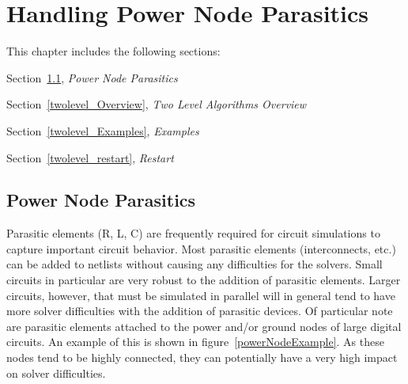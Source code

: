 



\chapter{Handling Power Node Parasitics}
\label{PowerNode_Chap}

{
This chapter includes the following sections:
\begin{XyceItemize}
\item Section~\ref{powerNode_Overview}, {\em Power Node Parasitics}
\item Section~\ref{twolevel_Overview}, {\em Two Level Algorithms Overview}
\item Section~\ref{twolevel_Examples}, {\em Examples}
\item Section~\ref{twolevel_restart}, {\em Restart}
\end{XyceItemize}
}

\section{Power Node Parasitics}
\label{powerNode_Overview}

Parasitic elements (R, L, C) are frequently required for circuit simulations
to capture important circuit behavior.  Most parasitic elements 
(interconnects, etc.) can be added to netlists without causing any 
difficulties for the \Xyce{} solvers.   Small circuits in particular are
very robust to the addition of parasitic elements. Larger circuits, however, 
that must be simulated in parallel will in general tend to 
have more solver difficulties with the addition of parasitic devices.  
Of particular note are parasitic elements attached to the power and/or
ground nodes of large digital circuits.  An example of this is shown in
figure~\ref{powerNodeExample}.  As these nodes tend to be highly 
connected, they can potentially have a very high impact on solver difficulties.  

